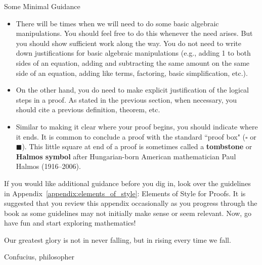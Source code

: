 \begin{section}{Some Minimal Guidance}
\begin{itemize}
\item There will be times when we will need to do some basic algebraic manipulations.  You should feel free to do this whenever the need arises.  But you should show sufficient work along the way.  You do not need to write down justifications for basic algebraic manipulations (e.g., adding 1 to both sides of an equation, adding and subtracting the same amount on the same side of an equation, adding like terms, factoring, basic simplification, etc.).  
\item On the other hand, you do need to make explicit justification of the logical steps in a proof.  As stated in the previous section, when necessary, you should cite a previous definition, theorem, etc.
\item Similar to making it clear where your proof begins, you should indicate where it ends.  It is common to conclude a proof with the standard ``proof box" ($\square$ or $\blacksquare$).  This little square at end of a proof is sometimes called a \textbf{tombstone} or \textbf{Halmos symbol} after Hungarian-born American mathematician Paul Halmos (1916--2006).
\end{itemize}

If you would like additional guidance before you dig in, look over the guidelines in Appendix~\ref{appendix:elements_of_style}: Elements of Style for Proofs. It is suggested that you review this appendix occasionally as you progress through the book as some guidelines may not initially make sense or seem relevant. Now, go have fun and start exploring mathematics!

\epigraph{Our greatest glory is not in never falling, but in rising every time we fall.}{Confucius, philosopher}

\end{section}